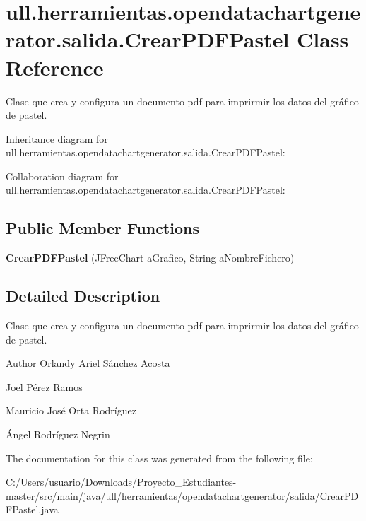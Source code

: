 \hypertarget{classull_1_1herramientas_1_1opendatachartgenerator_1_1salida_1_1_crear_p_d_f_pastel}{}\section{ull.\+herramientas.\+opendatachartgenerator.\+salida.\+Crear\+P\+D\+F\+Pastel Class Reference}
\label{classull_1_1herramientas_1_1opendatachartgenerator_1_1salida_1_1_crear_p_d_f_pastel}


Clase que crea y configura un documento pdf para imprirmir los datos del gráfico de pastel.  




Inheritance diagram for ull.\+herramientas.\+opendatachartgenerator.\+salida.\+Crear\+P\+D\+F\+Pastel\+:


Collaboration diagram for ull.\+herramientas.\+opendatachartgenerator.\+salida.\+Crear\+P\+D\+F\+Pastel\+:
\subsection*{Public Member Functions}
\begin{DoxyCompactItemize}
\item 
\mbox{\label{classull_1_1herramientas_1_1opendatachartgenerator_1_1salida_1_1_crear_p_d_f_pastel_ac471ce513c7ed6f30c42ca4ccd83fd66}} 
{\bfseries Crear\+P\+D\+F\+Pastel} (J\+Free\+Chart a\+Grafico, String a\+Nombre\+Fichero)
\end{DoxyCompactItemize}


\subsection{Detailed Description}
Clase que crea y configura un documento pdf para imprirmir los datos del gráfico de pastel. 

\begin{DoxyAuthor}{Author}
Orlandy Ariel Sánchez Acosta 

Joel Pérez Ramos 

Mauricio José Orta Rodríguez 

Ángel Rodríguez Negrin 
\end{DoxyAuthor}


The documentation for this class was generated from the following file\+:\begin{DoxyCompactItemize}
\item 
C\+:/\+Users/usuario/\+Downloads/\+Proyecto\+\_\+\+Estudiantes-\/master/src/main/java/ull/herramientas/opendatachartgenerator/salida/Crear\+P\+D\+F\+Pastel.\+java\end{DoxyCompactItemize}
